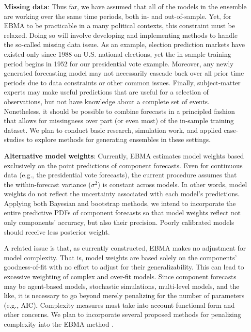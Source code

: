 \documentclass[pdftex,12pt,fullpage,oneside]{amsart}
\begin{document}
\textbf{Missing data}: Thus far, we have assumed that all of the
models in the ensemble are working over the same time periods, both
in- and out-of-sample. Yet, for EBMA to be practicable in a many
political contexts, this constraint must be relaxed.  Doing so will
involve developing and implementing methods to handle the so-called
missing data issue. As an example, election prediction markets have
existed only since 1988 on U.S. national elections, yet the in-sample
training period begins in 1952 for our presidential vote example.
Moreover, any newly generated forecasting model may not necessarily
cascade back over all prior time periods due to data constraints or
other common issues. Finally, subject-matter experts may make useful
predictions that are useful for a selection of observations, but not
have knowledge about a complete set of events.  Nonetheless, it should
be possible to combine forecasts in a principled fashion that allows
for missingness over part (or even most) of the in-sample training
dataset.  We plan to conduct basic research, simulation work, and
applied case-studies to explore methods for generating ensembles in
these settings.

\textbf{Alternative model weights}: Currently, EBMA estimates model
weights based exclusively on the point predictions of component
forecasts.  Even for continuous data (e.g., the presidential vote
forecasts), the current procedure assumes that the within-forecast
variance ($\sigma^2$) is constant across models.  In other words,
model weights do not reflect the uncertainty associated with each
model's predictions.  Applying both Bayesian and bootstrap methods, we
intend to incorporate the entire predictive PDFs of component
forecasts so that model weights reflect not only components' accuracy,
but also their precision.  Poorly calibrated models should receive less
posterior weight.

A related issue is that, as currently constructed, EBMA makes no
adjustment for model complexity. That is, model weights are based
solely on the components’ goodness-of-fit with no effort to adjust for
their generalizability. This can lead to excessive weighting of
complex and over-fit models. Since component forecasts may be
agent-based models, stochastic simulations, multi-level models, and
the like, it is necessary to go beyond merely penalizing for the
number of parameters (e.g., AIC). Complexity measures must take into
account functional form and other concerns. We plan to incorporate
several proposed methods for penalizing complexity into the EBMA
method \citep[c.f.,][]{Pitt:2002a, Pitt:2002b, Spiegelhalter:2002}.
\end{document}
